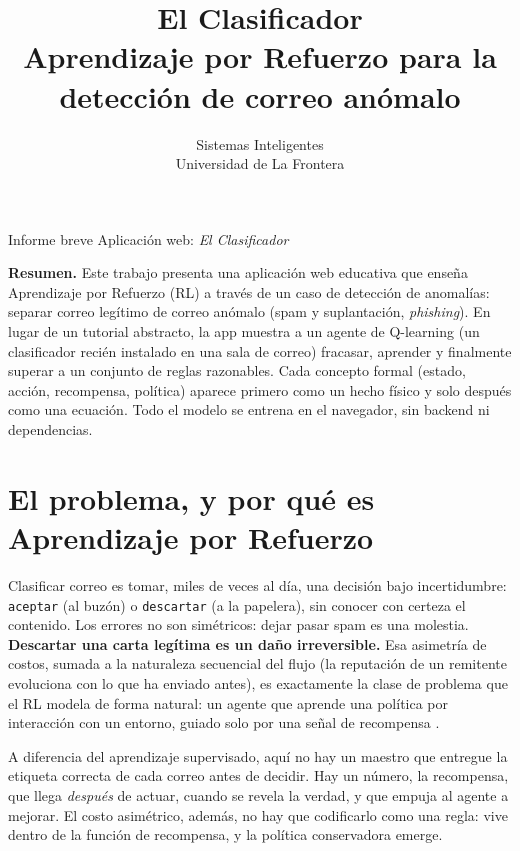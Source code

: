 \documentclass[11pt]{article}
\title{\textbf{El Clasificador}\\[0.2em]\large Aprendizaje por Refuerzo para la detección de correo anómalo}
\author{Sistemas Inteligentes \\ Universidad de La Frontera}
\date{}
\begin{document}
\maketitle
\vspace{-2em}
\begin{center}
\small Informe breve \quad\textbullet\quad Aplicación web: \textit{El Clasificador}
\end{center}
\vspace{1em}

\noindent\textbf{Resumen.} Este trabajo presenta una aplicación web educativa
que enseña Aprendizaje por Refuerzo (RL) a través de un caso de detección de
anomalías: separar correo legítimo de correo anómalo (spam y suplantación,
\textit{phishing}). En lugar de un tutorial abstracto, la app muestra a un
agente de Q-learning (un clasificador recién instalado en una sala de correo)
fracasar, aprender y finalmente superar a un conjunto de reglas razonables.
Cada concepto formal (estado, acción, recompensa, política) aparece primero
como un hecho físico y solo después como una ecuación. Todo el modelo se
entrena en el navegador, sin backend ni dependencias.

\section{El problema, y por qué es Aprendizaje por Refuerzo}

Clasificar correo es tomar, miles de veces al día, una decisión bajo
incertidumbre: \texttt{aceptar} (al buzón) o \texttt{descartar} (a la
papelera), sin conocer con certeza el contenido. Los errores no son
simétricos: dejar pasar spam es una molestia. \textbf{Descartar una carta
legítima es un daño irreversible.} Esa asimetría de costos, sumada a la
naturaleza secuencial del flujo (la reputación de un remitente evoluciona con
lo que ha enviado antes), es exactamente la clase de problema que el RL
modela de forma natural: un agente que aprende una política por interacción
con un entorno, guiado solo por una señal de recompensa \cite{sutton2018}.

A diferencia del aprendizaje supervisado, aquí no hay un maestro que entregue
la etiqueta correcta de cada correo antes de decidir. Hay un número, la
recompensa, que llega \textit{después} de actuar, cuando se revela la verdad,
y que empuja al agente a mejorar. El costo asimétrico, además, no hay que
codificarlo como una regla: vive dentro de la función de recompensa, y la
política conservadora emerge.
\end{document}

